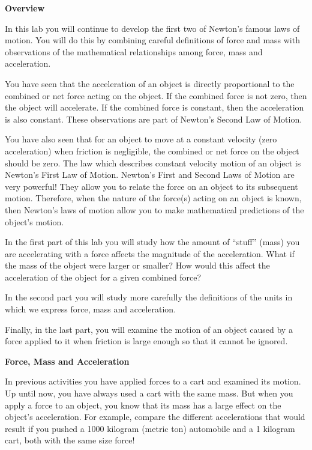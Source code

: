 \bigskip
\textbf{Overview }
\medskip

In this lab you will continue to develop the first two of Newton's famous laws
of motion. You will do this by combining careful definitions of force and mass
with observations of the mathematical relationships among force, mass and acceleration.
\medskip

You have seen that the acceleration of an object is directly proportional to
the combined or net force acting on the object. If the combined force is not
zero, then the object will accelerate. If the combined force is constant, then
the acceleration is also constant. These observations are part of Newton's Second
Law of Motion.
\medskip

You have also seen that for an object to move at a constant velocity (zero acceleration)
when friction is negligible, the combined or net force on the object should
be zero. The law which describes constant velocity motion of an object is Newton's
First Law of Motion. Newton's First and Second Laws of Motion are very powerful!
They allow you to relate the force on an object to its subsequent motion. Therefore,
when the nature of the force(s) acting on an object is known, then Newton's
laws of motion allow you to make mathematical predictions of the object's motion. 

In the first part of this lab you will study how the amount of ``stuff''
(mass) you are accelerating with a force affects the magnitude of the acceleration.
What if the mass of the object were larger or smaller? How would this affect
the acceleration of the object for a given combined force? 

In the second part you will study more carefully the definitions of the units
in which we express force, mass and acceleration.

Finally, in the last part, you will examine the motion of an object caused by
a force applied to it when friction is large enough so that it cannot be ignored.
\medskip

\textbf{Force, Mass and Acceleration }

In previous activities you have applied forces to a cart and examined its motion.
Up until now, you have always used a cart with the same mass. But when you apply
a force to an object, you know that its mass has a large effect on the object's
acceleration. For example, compare the different accelerations that would result
if you pushed a 1000 kilogram (metric ton) automobile and a 1 kilogram cart,
both with the same size force! 

